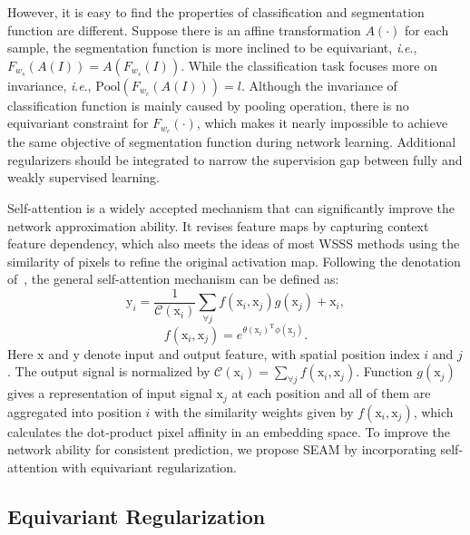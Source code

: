 \documentclass[10pt,twocolumn,letterpaper]{article}
\begin{document}
	However, it is easy to find the properties of classification and segmentation function are different. Suppose there is an affine transformation $A(\cdot)$ for each sample, the segmentation function is more inclined to be equivariant, \textit{i}.\textit{e}., $F_{w_s}(A(I))=A(F_{w_s}(I))$. While the classification task focuses more on invariance, \textit{i}.\textit{e}., $\mathrm{Pool}(F_{w_c}(A(I)))=l$. Although the invariance of classification function is mainly caused by pooling operation, there is no equivariant constraint for $F_{w_c}(\cdot)$, which makes it nearly impossible to achieve the same objective of segmentation function during network learning. Additional regularizers should be integrated to narrow the supervision gap between fully and weakly supervised learning.
	
	Self-attention is a widely accepted mechanism that can significantly improve the network approximation ability. It revises feature maps by capturing context feature dependency, which also meets the ideas of most WSSS methods using the similarity of pixels to refine the original activation map. Following the denotation of~\cite{nonlocal}, the general self-attention mechanism can be defined as:
	\begin{equation}
	\label{eq:nonlocal}
	\mathrm{y}_i = \frac{1}{\mathcal{C}(\mathrm{x}_i)}\sum_{\forall j}f(\mathrm{x}_i, \mathrm{x}_j)g(\mathrm{x}_j)+\mathrm{x}_i,
	\end{equation}
	\begin{equation}
	\label{eq:gaussianfunc}
	f(\mathrm{x}_i, \mathrm{x}_j)=e^{\theta(\mathrm{x}_i)^\mathrm{T}\phi(\mathrm{x}_j)}.
	\end{equation}
	Here $\mathrm{x}$ and $\mathrm{y}$ denote input and output feature, with spatial position index $i$ and $j$. The output signal is normalized by $\mathcal{C}(\mathrm{x}_i)=\sum_{\forall j}f(\mathrm{x}_i,\mathrm{x}_j)$. Function $g(\mathrm{x}_j)$ gives a representation of input signal $\mathrm{x}_j$ at each position and all of them are aggregated into position $i$ with the similarity weights given by $f(\mathrm{x}_i,\mathrm{x}_j)$, which calculates the dot-product pixel affinity in an embedding space. To improve the network ability for consistent prediction, we propose SEAM by incorporating self-attention with equivariant regularization.
	
	\subsection{Equivariant Regularization}
	\label{subsec:er}
	
\end{document}
